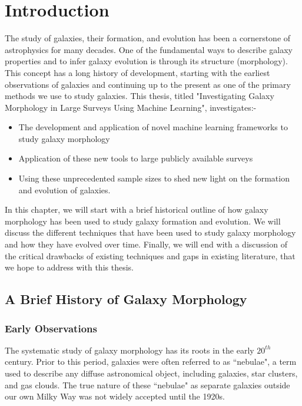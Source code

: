 \chapter{Introduction} \label{chap:intro}

The study of galaxies, their formation, and evolution has been a cornerstone of astrophysics for many decades. One of the fundamental ways to describe galaxy properties and to infer galaxy evolution is through its structure (morphology). This concept has a long history of development, starting with the earliest observations of galaxies and continuing up to the present as one of the primary methods we use to study galaxies. This thesis, titled "Investigating Galaxy Morphology in Large Surveys Using Machine Learning", investigates:-

\begin{itemize}
    \item The development and application of novel machine learning frameworks to study galaxy morphology
    \item Application of these new tools to large publicly available surveys
    \item Using these unprecedented sample sizes to shed new light on the formation and evolution of galaxies. 
\end{itemize}

In this chapter, we will start with a brief historical outline of how galaxy morphology has been used to study galaxy formation and evolution. We will discuss the different techniques that have been used to study galaxy morphology and how they have evolved over time. Finally, we will end with a discussion of the critical drawbacks of existing techniques and gaps in existing literature, that we hope to address with this thesis. 

\section{A Brief History of Galaxy Morphology} \label{sec_intro:history}

\subsection{Early Observations} \label{sec_intro:early_obs}

The systematic study of galaxy morphology has its roots in the early $20^{th}$ century. Prior to this period, galaxies were often referred to as ``nebulae", a term used to describe any diffuse astronomical object, including galaxies, star clusters, and gas clouds. The true nature of these ``nebulae" as separate galaxies outside our own Milky Way was not widely accepted until the 1920s.


